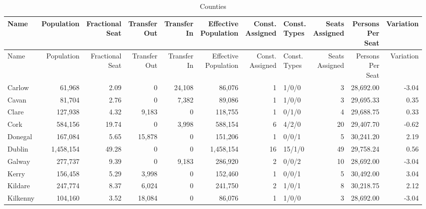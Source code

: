 \documentclass[a4paper]{article}
\begin{document}
\begin{longtable}{lrrrrrrlrrr}
\caption{Counties}
\\ \toprule
Name &Population &\shortstack{Fractional\\Seat} &\shortstack{Transfer\\Out} &\shortstack{Transfer\\In} &\shortstack{Effective\\Population} &\shortstack{Const.\\Assigned} &\shortstack{Const.\\Types} &\shortstack{Seats\\Assigned} &\shortstack{Persons\\Per\\Seat} &Variation \\ \midrule
\endfirsthead
\toprule
Name &Population &\shortstack{Fractional\\Seat} &\shortstack{Transfer\\Out} &\shortstack{Transfer\\In} &\shortstack{Effective\\Population} &\shortstack{Const.\\Assigned} &\shortstack{Const.\\Types} &\shortstack{Seats\\Assigned} &\shortstack{Persons\\Per\\Seat} &Variation \\ \midrule
\endhead
\bottomrule
\endfoot
Carlow&61,968& 2.09&0&24,108&86,076&1&1/0/0&3&28,692.00&-3.04\\ 
Cavan&81,704& 2.76&0&7,382&89,086&1&1/0/0&3&29,695.33& 0.35\\ 
Clare&127,938& 4.32&9,183&0&118,755&1&0/1/0&4&29,688.75& 0.33\\ 
Cork&584,156&19.74&0&3,998&588,154&6&4/2/0&20&29,407.70&-0.62\\ 
Donegal&167,084& 5.65&15,878&0&151,206&1&0/0/1&5&30,241.20& 2.19\\ 
Dublin&1,458,154&49.28&0&0&1,458,154&16&15/1/0&49&29,758.24& 0.56\\ 
Galway&277,737& 9.39&0&9,183&286,920&2&0/0/2&10&28,692.00&-3.04\\ 
Kerry&156,458& 5.29&3,998&0&152,460&1&0/0/1&5&30,492.00& 3.04\\ 
Kildare&247,774& 8.37&6,024&0&241,750&2&1/0/1&8&30,218.75& 2.12\\ 
Kilkenny&104,160& 3.52&18,084&0&86,076&1&1/0/0&3&28,692.00&-3.04\\ 

\end{longtable}
\end{document}
